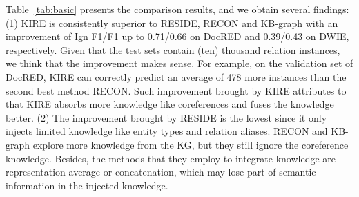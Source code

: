 \documentclass[runningheads]{llncs}
\begin{document}
Table~\ref{tab:basic} presents the comparison results, and we obtain several findings: 
(1) KIRE is consistently superior to RESIDE, RECON and KB-graph with an improvement of Ign F1/F1 up to 0.71/0.66 on DocRED and 0.39/0.43 on DWIE, respectively. 
Given that the test sets contain (ten) thousand relation instances, we think that the improvement makes sense.
For example, on the validation set of DocRED, KIRE can correctly predict an average of 478 more instances than the second best method RECON.
Such improvement brought by KIRE attributes to that KIRE absorbs more knowledge like coreferences and fuses the knowledge better.
(2) The improvement brought by RESIDE is the lowest since it only injects limited knowledge like entity types and relation aliases. 
RECON and KB-graph explore more knowledge from the KG, but they still ignore the coreference knowledge. 
Besides, the methods that they employ to integrate knowledge are representation average or concatenation, which may lose part of semantic information in the injected knowledge.
\end{document}
